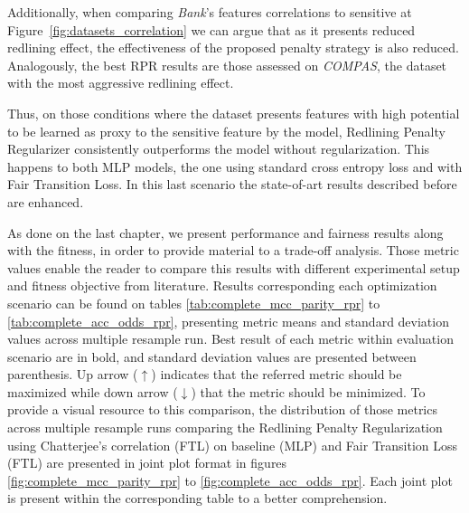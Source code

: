 Additionally, when comparing \textit{Bank}'s features correlations to sensitive at Figure~\ref{fig:datasets_correlation} we can argue that as it presents reduced redlining effect, the effectiveness of the proposed penalty strategy is also reduced. Analogously, the best RPR results are those assessed on \textit{COMPAS}, the dataset with the most aggressive redlining effect.

Thus, on those conditions where the dataset presents features with high potential to be learned as proxy to the sensitive feature by the model, Redlining Penalty Regularizer consistently outperforms the model without regularization. This happens to both MLP models, the one using standard cross entropy loss and with Fair Transition Loss. In this last scenario the state-of-art results described before are enhanced.

As done on the last chapter, we present performance and fairness results along with the fitness, in order to provide material to a trade-off analysis. Those metric values enable the reader to compare this results with different experimental setup and fitness objective from literature. Results corresponding each optimization scenario can be found on tables \ref{tab:complete_mcc_parity_rpr} to \ref{tab:complete_acc_odds_rpr}, presenting metric means and standard deviation values across multiple resample run. Best result of each metric within evaluation scenario are in bold, and standard deviation values are presented between parenthesis. Up arrow ($\uparrow$) indicates that the referred metric should be maximized while down arrow ($\downarrow$) that the metric should be minimized. To provide a visual resource to this comparison, the distribution of those metrics across multiple resample runs comparing the Redlining Penalty Regularization using Chatterjee's correlation (FTL) on baseline (MLP) and Fair Transition Loss (FTL) are presented in joint plot format in figures \ref{fig:complete_mcc_parity_rpr} to \ref{fig:complete_acc_odds_rpr}. Each joint plot is present within the corresponding table to a better comprehension.

\newpage

